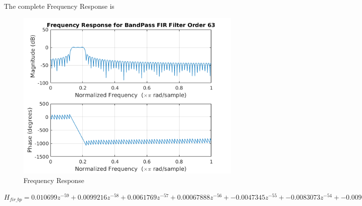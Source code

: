 \documentclass[22pt]{article}
\begin{document}
The complete Frequency Response is
\begin{figure}[H]
  \centering
  \includegraphics[scale=0.75]{images/FIR_bp_freqz}
  \caption{Frequency Response}
  \label{fig:9}
\end{figure}

$H_{fir\_bp} = 0.010699z^{-59} +0.0099216z^{-58} +0.0061769z^{-57} +0.00067888z^{-56} +-0.0047345z^{-55} +-0.0083073z^{-54} +-0.0090412z^{-53} +-0.0070586z^{-52} +-0.0035005z^{-51} +1.5549e-17z^{-50} +0.0020437z^{-49} +0.0020753z^{-48} +0.0006074z^{-47} +-0.0010474z^{-46} +-0.0014292z^{-45} +0.00031922z^{-44} +0.0039434z^{-43} +0.0080615z^{-42} +0.010683z^{-41} +0.010067z^{-40} +0.0055652z^{-39} +-0.0019308z^{-38} +-0.010166z^{-37} +-0.016293z^{-36} +-0.017965z^{-35} +-0.014297z^{-34} +-0.0062993z^{-33} +0.0034278z^{-32} +0.011658z^{-31} +0.015779z^{-30} +0.014805z^{-29} +0.009742z^{-28} +0.0031172z^{-27} +-0.0021396z^{-26} +-0.0040068z^{-25} +-0.0023031z^{-24} +0.0011925z^{-23} +0.003537z^{-22} +0.0020435z^{-21} +-0.0042678z^{-20} +-0.013846z^{-19} +-0.022858z^{-18} +-0.026534z^{-17} +-0.021167z^{-16} +-0.0059818z^{-15} +0.01592z^{-14} +0.038073z^{-13} +0.05258z^{-12} +0.052901z^{-11} +0.036481z^{-10} +0.0062323z^{-9} +-0.029837z^{-8} +-0.060854z^{-7} +-0.07654z^{-6} +-0.070733z^{-5} +-0.04374z^{-4} +-0.0026197z^{-3} +0.040796z^{-2} +0.073555z^{-1} +0.085714z^{0} +0.073555z^{1} +0.040796z^{2} +-0.0026197z^{3} +-0.04374z^{4} +-0.070733z^{5} +-0.07654z^{6} +-0.060854z^{7} +-0.029837z^{8} +0.0062323z^{9} +0.036481z^{10} +0.052901z^{11} +0.05258z^{12} +0.038073z^{13} +0.01592z^{14} +-0.0059818z^{15} +-0.021167z^{16} +-0.026534z^{17} +-0.022858z^{18} +-0.013846z^{19} +-0.0042678z^{20} +0.0020435z^{21} +0.003537z^{22} +0.0011925z^{23} +-0.0023031z^{24} +-0.0040068z^{25} +-0.0021396z^{26} +0.0031172z^{27} +0.009742z^{28} +0.014805z^{29} +0.015779z^{30} +0.011658z^{31} +0.0034278z^{32} +-0.0062993z^{33} +-0.014297z^{34} +-0.017965z^{35} +-0.016293z^{36} +-0.010166z^{37} +-0.0019308z^{38} +0.0055652z^{39} +0.010067z^{40} +0.010683z^{41} +0.0080615z^{42} +0.0039434z^{43} +0.00031922z^{44} +-0.0014292z^{45} +-0.0010474z^{46} +0.0006074z^{47} +0.0020753z^{48} +0.0020437z^{49} +1.5549e-17z^{50} +-0.0035005z^{51} +-0.0070586z^{52} +-0.0090412z^{53} +-0.0083073z^{54} +-0.0047345z^{55} +0.00067888z^{56} +0.0061769z^{57} +0.0099216z^{58} +0.010699z^{59}$
\end{document}
